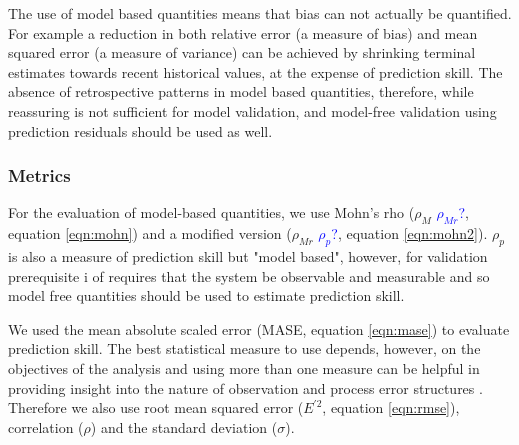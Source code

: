 \documentclass[12pt,halfline,a4paper,nonumbib]{ouparticle}
\newcommand{\toshi}{\textcolor{blue}}
\begin{document}
The use of model based quantities means that bias can not actually be quantified. For example a reduction in both relative error (a measure of bias) and mean squared error (a measure of variance) can be achieved by shrinking terminal estimates towards recent historical values, at the expense of prediction skill. The absence of retrospective patterns in model based quantities, therefore, while reassuring is not sufficient for model validation, and model-free validation using prediction residuals should be used as well.


\subsubsection{Metrics}

For the evaluation of model-based quantities, we use Mohn's rho ($\rho_M$ \toshi{$\rho_{Mr}$?}, equation \ref{eqn:mohn}) and a modified version ($\rho_{Mr}$ \toshi{$\rho_{p}$?}, equation \ref{eqn:mohn2}). $\rho_{p}$ is also a measure of prediction skill but "model based", however, for validation prerequisite i of \cite{hodges1992you} requires that the system be observable and measurable and so model free quantities should be used to estimate prediction skill.

We used the mean absolute scaled error (MASE, equation \ref{eqn:mase}) to evaluate prediction skill. The best statistical measure to use depends, however, on the objectives of the analysis and using more than one measure can be helpful in providing insight into the nature of observation and process error structures \parencite{kell2016xval}. Therefore we also use root mean squared error ($E^{\prime 2}$, equation \ref{eqn:rmse}), correlation ($\rho$) and the standard deviation ($\sigma$). 
\end{document}
